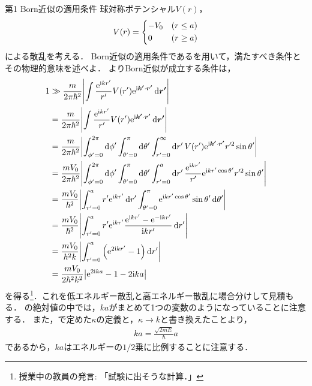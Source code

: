 \documentclass{report}
\begin{document}
  \begin{myex}{第1 Born近似の適用条件}{}
    球対称ポテンシャル$V(r)$，
    \begin{align}
      V(r) = \begin{dcases}
        -V_0 &(r \leq a)\\
        0 &(r \geq a)
      \end{dcases}
    \end{align}
    による散乱を考える．
    Born近似の適用条件であるを用いて，満たすべき条件とその物理的意味を述べよ．
    \tcblower
    よりBorn近似が成立する条件は，%
    \begin{align}
      1 &\gg \frac{m}{2\pi \hbar^2}\abs{\int \frac{\mathrm{e}^{\mathrm{i} kr'}}{r'}V(r')\mathrm{e}^{\mathrm{i}\bm{k '}\cdot\bm{r'}}\dd{\bm{r'}}} \\
      &= \frac{m}{2\pi \hbar^2}\abs{\int \frac{\mathrm{e}^{\mathrm{i} kr'}}{r'}V(r')\mathrm{e}^{\mathrm{i}\bm{k'}\cdot\bm{r'}}\dd{\bm{r'}}} \\
      &= \frac{m}{2\pi \hbar^2}\abs{\int_{\phi' = 0}^{2\pi}\dd{\phi'}\int_{\theta' = 0}^{\pi}\dd{\theta'}\int_{r' = 0}^{\infty}\dd{r'}V(r')\mathrm{e}^{\mathrm{i}\bm{k'}\cdot\bm{r'}}r'^2\sin\theta'} \\ 
      &= \frac{mV_0}{2\pi \hbar^2}\abs{\int_{\phi' = 0}^{2\pi}\dd{\phi'}\int_{\theta' = 0}^{\pi}\dd{\theta'}\int_{r' = 0}^{a}\dd{r'} \frac{\mathrm{e}^{\mathrm{i} kr'}}{r'}\mathrm{e}^{\mathrm{i} kr'\cos\theta'}r'^2\sin\theta'} \\ 
      &= \frac{mV_0}{\hbar^2}\abs{\int_{r' = 0}^{a}r'\mathrm{e}^{\mathrm{i} kr'}\dd{r'}\int_{\theta' = 0}^{\pi}\mathrm{e}^{\mathrm{i} kr'\cos\theta'}\sin\theta'\dd{\theta'}} \\
      &= \frac{mV_0}{\hbar^2}\abs{\int_{r' = 0}^{a}r'\mathrm{e}^{\mathrm{i} kr'}\frac{\mathrm{e}^{\mathrm{i} kr'} - \mathrm{e}^{-\mathrm{i} kr'}}{\mathrm{i} kr'}\dd{r'}} \\
      &= \frac{mV_0}{\hbar^2k}\abs{\int_{r' = 0}^{a}\qty(\mathrm{e}^{2\mathrm{i} kr'} - 1)\dd{r'}} \\
      &= \frac{mV_0}{2\hbar^2 k^2}\abs{\mathrm{e}^{2\mathrm{i} ka} - 1 - 2\mathrm{i} ka}\label{born-limit-ball}
    \end{align}
    を得る\footnote{授業中の教員の発言: 「試験に出そうな計算．」}．これを低エネルギー散乱と高エネルギー散乱に場合分けして見積もる．
    の絶対値の中では，$ka$がまとめて1つの変数のようになっていることに注意する．
    また，で定めた$\kappa$の定義と，$\kappa \to k$と書き換えたことより，
    \begin{align}
      ka = \frac{\sqrt{2mE}}{\hbar}a
    \end{align}
    であるから，$ka$はエネルギーの$1/2$乗に比例することに注意する．

\end{myex}
\end{document}
